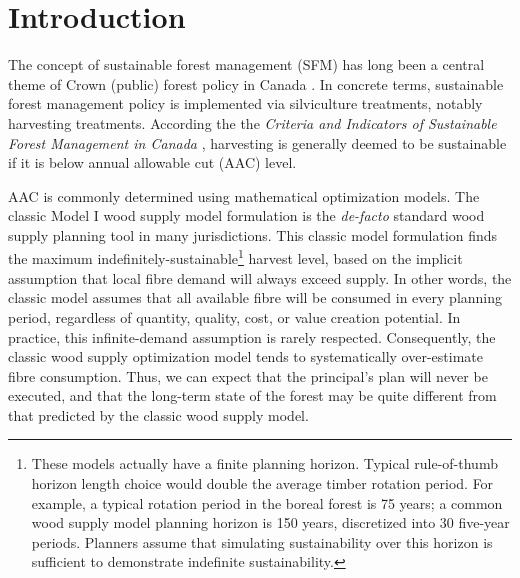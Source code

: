 \section{Introduction}
\label{sec:introduction2}

The concept of sustainable forest management (SFM) has long been a central theme of Crown (public) forest policy in Canada \citep{ccfm2008vision}. In concrete terms, sustainable forest management policy is implemented via silviculture treatments, notably harvesting treatments. According the the \emph{Criteria and Indicators of Sustainable Forest Management in Canada} \citep{ccfm2006criteria}, harvesting is generally deemed to be sustainable if it is below annual allowable cut (AAC) level. 


AAC is commonly determined using mathematical optimization models. 
The classic Model I \citep{davis2001forest-ch13} wood supply model formulation is the \emph{de-facto} standard wood supply planning tool in many jurisdictions.  
This classic model formulation finds the maximum indefinitely-sustainable\footnote{These models actually have a finite planning horizon. Typical rule-of-thumb horizon length choice would double the average timber rotation period. For example, a typical rotation period in the boreal forest is 75 years; a common wood supply model planning horizon is 150 years, discretized into 30 five-year periods. Planners assume that simulating sustainability over this horizon is sufficient to demonstrate indefinite sustainability.} harvest level, based on the implicit assumption that local fibre demand will always exceed supply.
In other words, the classic model assumes that all available fibre will be consumed in every planning period, regardless of quantity, quality, cost, or value creation potential.
In practice, this infinite-demand assumption is rarely respected.
Consequently, the classic wood supply optimization model tends to systematically over-estimate fibre consumption. Thus, we can expect that the principal's plan will never be executed, and that the long-term state of the forest may be quite different from that predicted by the classic wood supply model.

